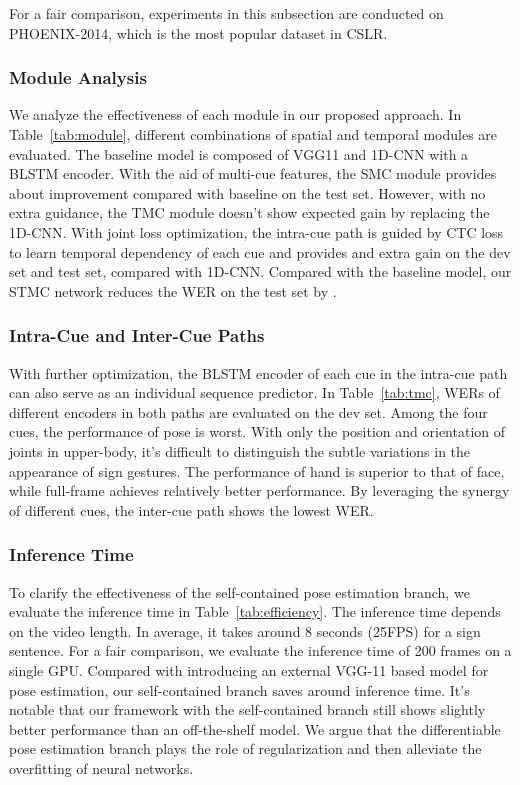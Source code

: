 \documentclass[letterpaper]{article} \usepackage{aaai20}  \usepackage{times}  \usepackage{helvet} \usepackage{courier}  \usepackage[hyphens]{url}  \usepackage{graphicx} \urlstyle{rm} \def\UrlFont{\rm}  \usepackage{graphicx}  \frenchspacing  \setlength{\pdfpagewidth}{8.5in}  \setlength{\pdfpageheight}{11in}
\begin{document}
For a fair comparison, experiments in this subsection are conducted on PHOENIX-2014, which is the most popular dataset in CSLR.
\subsubsection{Module Analysis}
We analyze the effectiveness of each module in our proposed approach. In Table~\ref{tab:module}, different combinations of spatial and temporal modules are evaluated. The baseline model is composed of VGG11 and 1D-CNN with a BLSTM encoder. With the aid of multi-cue features, the SMC module provides about  improvement compared with baseline on the test set. However, with no extra guidance, the TMC module doesn't show expected gain by replacing the 1D-CNN. With joint loss optimization, the intra-cue path is guided by CTC loss to learn temporal dependency of each cue and provides  and  extra gain on the dev set and test set, compared with 1D-CNN. Compared with the baseline model, our STMC network reduces the WER on the test set by . 

\subsubsection{Intra-Cue and Inter-Cue Paths}
With further optimization, the BLSTM encoder of each cue in the intra-cue path can also serve as an individual sequence predictor. In Table~\ref{tab:tmc}, WERs of different encoders in both paths are evaluated on the dev set. Among the four cues, the performance of pose is worst. With only the position and orientation of joints in upper-body, it's difficult to distinguish the subtle variations in the appearance of sign gestures. The performance of hand is superior to that of face, while full-frame achieves relatively better performance. By leveraging the synergy of different cues, the inter-cue path shows the lowest WER. 

\subsubsection{Inference Time} 
To clarify the effectiveness of the self-contained pose estimation branch, we evaluate the inference time in Table~\ref{tab:efficiency}. The inference time depends on the video length. In average, it takes around 8 seconds (25FPS) for a sign sentence. For a fair comparison, we evaluate the inference time of 200 frames on a single GPU. Compared with introducing an external VGG-11 based model for pose estimation, our self-contained branch saves around  inference time. It's notable that our framework with the self-contained branch still shows slightly better performance than an off-the-shelf model. We argue that the differentiable pose estimation branch plays the role of regularization and then alleviate the overfitting of neural networks. 
\end{document}
